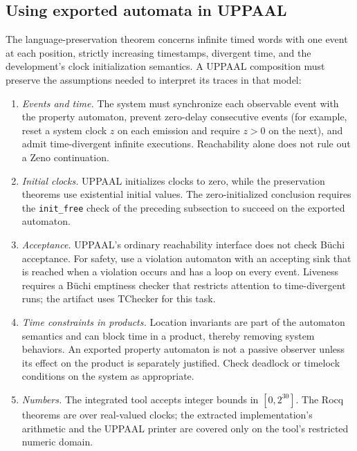 \documentclass{ieeeaccess}
\begin{document}
\subsection{Using exported automata in UPPAAL}
The language-preservation theorem concerns infinite timed words with one
event at each position, strictly increasing timestamps, divergent time, and
the development's clock initialization semantics. A UPPAAL composition must
preserve the assumptions needed to interpret its traces in that model:
\begin{enumerate}[label=(C\arabic*),leftmargin=*]
  \item \emph{Events and time.} The system must synchronize each observable
        event with the property automaton, prevent zero-delay consecutive
        events (for example, reset a system clock $z$ on each emission and
        require $z>0$ on the next), and admit time-divergent infinite
        executions. Reachability alone does not rule out a Zeno continuation.
  \item \emph{Initial clocks.} UPPAAL initializes clocks to zero, while the
        preservation theorems use existential initial values. The
        zero-initialized conclusion requires the \texttt{init\_free} check
        of the preceding subsection to succeed on the exported automaton.
  \item \emph{Acceptance.} UPPAAL's ordinary reachability interface does not
        check B\"uchi acceptance. For safety, use a violation automaton with
        an accepting sink that is reached when a violation occurs and has a
        loop on every event. Liveness requires a B\"uchi emptiness checker
        that restricts attention to time-divergent runs; the artifact uses
        TChecker for this task.
  \item \emph{Time constraints in products.} Location invariants are part of
        the automaton semantics and can block time in a product, thereby
        removing system behaviors. An exported property automaton is not a
        passive observer unless its effect on the product is separately
        justified. Check deadlock or timelock conditions on the system as
        appropriate.
  \item \emph{Numbers.} The integrated tool accepts integer bounds in
        $[0,2^{30}]$. The Rocq theorems are over real-valued clocks; the
        extracted implementation's arithmetic and the UPPAAL printer are
        covered only on the tool's restricted numeric domain.
\end{enumerate}
\end{document}

